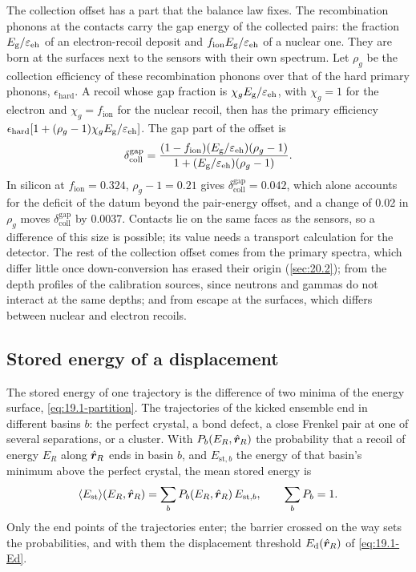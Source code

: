 The collection offset has a part that the balance law fixes. The recombination phonons at the contacts carry the gap energy of the collected pairs: the fraction $E_{\mathrm{g}}/\varepsilon_{\mathrm{eh}}$ of an electron-recoil deposit and $f_{\mathrm{ion}}E_{\mathrm{g}}/\varepsilon_{\mathrm{eh}}$ of a nuclear one. They are born at the surfaces next to the sensors with their own spectrum. Let $\rho_g$ be the collection efficiency of these recombination phonons over that of the hard primary phonons, $\epsilon_{\mathrm{hard}}$. A recoil whose gap fraction is $\chi_gE_{\mathrm{g}}/\varepsilon_{\mathrm{eh}}$, with $\chi_g = 1$ for the electron and $\chi_g = f_{\mathrm{ion}}$ for the nuclear recoil, then has the primary efficiency $\epsilon_{\mathrm{hard}}[1 + (\rho_g - 1)\chi_gE_{\mathrm{g}}/\varepsilon_{\mathrm{eh}}]$. The gap part of the offset is
\begin{equation}
  \delta^{\mathrm{gap}}_{\mathrm{coll}} = \frac{(1 - f_{\mathrm{ion}})(E_{\mathrm{g}}/\varepsilon_{\mathrm{eh}})(\rho_g - 1)}{1 + (E_{\mathrm{g}}/\varepsilon_{\mathrm{eh}})(\rho_g - 1)} .
  \label{eq:19.5-dgap}
\end{equation}
In silicon at $f_{\mathrm{ion}} = 0.324$, $\rho_g - 1 = 0.21$ gives $\delta^{\mathrm{gap}}_{\mathrm{coll}} = 0.042$, which alone accounts for the deficit of the datum beyond the pair-energy offset, and a change of 0.02 in $\rho_g$ moves $\delta^{\mathrm{gap}}_{\mathrm{coll}}$ by 0.0037. Contacts lie on the same faces as the sensors, so a difference of this size is possible; its value needs a transport calculation for the detector. The rest of the collection offset comes from the primary spectra, which differ little once down-conversion has erased their origin (\cref{sec:20.2}); from the depth profiles of the calibration sources, since neutrons and gammas do not interact at the same depths; and from escape at the surfaces, which differs between nuclear and electron recoils.

\subsection{Stored energy of a displacement}\label{sec:19.4}\label{sec:19.4-single}

The stored energy of one trajectory is the difference of two minima of the energy surface, \cref{eq:19.1-partition}. The trajectories of the kicked ensemble end in different basins $b$: the perfect crystal, a bond defect, a close Frenkel pair at one of several separations, or a cluster. With $P_b(E_R, \hat{\bm{r}}_R)$ the probability that a recoil of energy $E_R$ along $\hat{\bm{r}}_R$ ends in basin $b$, and $E_{\mathrm{st},b}$ the energy of that basin's minimum above the perfect crystal, the mean stored energy is
\begin{equation}
  \langle E_{\mathrm{st}}\rangle(E_R, \hat{\bm{r}}_R) = \sum_bP_b(E_R, \hat{\bm{r}}_R)\,E_{\mathrm{st},b} , \qquad \sum_bP_b = 1 .
  \label{eq:19.4-mean}
\end{equation}
Only the end points of the trajectories enter; the barrier crossed on the way sets the probabilities, and with them the displacement threshold $E_{\mathrm{d}}(\hat{\bm{r}}_R)$ of \cref{eq:19.1-Ed}.

